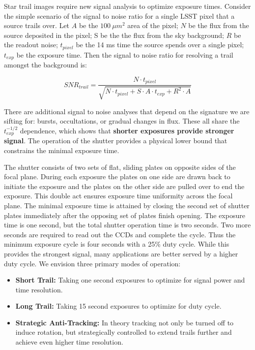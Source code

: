 \documentclass[12pt, letterpaper]{article}
\begin{document}
Star trail images require new signal analysis to optimize exposure times. Consider the simple scenario of the signal to noise ratio for a single LSST pixel that a source trails over. Let $A$ be the $100\ \mu m^2$ area of the pixel; $N$ be the flux from the source deposited in the pixel; S be the the flux from the sky background; $R$ be the readout noise; $t_{pixel}$ be the 14 ms time the source spends over a single pixel; $t_{exp}$ be the exposure time. Then the signal to noise ratio for resolving a trail amongst the background is:

$$SNR_{trail} = \frac{N\cdot t_{pixel}}{\sqrt{N\cdot t_{pixel} + S \cdot A \cdot t_{exp} + R^2\cdot A}}$$

\noindent There are additional signal to noise analyses that depend on the signature we are sifting for: bursts, occultations, or gradual changes in flux. These all share the $t_{exp}^{-1/2}$ dependence, which shows that \textbf{shorter exposures provide stronger signal}. The operation of the shutter provides a physical lower bound that constrains the minimal exposure time.

The shutter consists of two sets of flat, sliding plates on opposite sides of the focal plane. During each exposure the plates on one side are drawn back to initiate the exposure and the plates on the other side are pulled over to end the exposure. This double act ensures exposure time uniformity across the focal plane. The minimal exposure time is attained by closing the second set of shutter plates immediately after the opposing set of plates finish opening. The exposure time is one second, but the total shutter operation time is two seconds. Two more seconds are required to read out the CCDs and complete the cycle. Thus the minimum exposure cycle is four seconds with a 25\% duty cycle. While this provides the strongest signal, many applications are better served by a higher duty cycle. We envision three primary modes of operation:

\begin{itemize}
\item \textbf{Short Trail:} Taking one second exposures to optimize for signal power and time resolution.

\item \textbf{Long Trail:} Taking 15 second exposures to optimize for duty cycle.

\item \textbf{Strategic Anti-Tracking:} In theory tracking not only be turned off to induce rotation, but strategically controlled to extend trails further and achieve even higher time resolution. 
\end{itemize}
\end{document}
